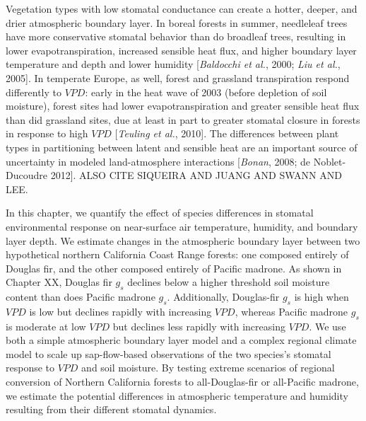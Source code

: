 Vegetation types with low stomatal conductance can create a hotter, deeper, and drier atmospheric boundary layer.  In boreal forests in summer, needleleaf trees have more conservative stomatal behavior than do broadleaf trees, resulting in lower evapotranspiration, increased sensible heat flux, and higher boundary layer temperature and depth and lower humidity [\textit{Baldocchi et al.}, 2000; \textit{Liu et al.}, 2005].  In temperate Europe, as well, forest and grassland transpiration respond differently to $VPD$: early in the heat wave of 2003 (before depletion of soil moisture), forest sites had lower evapotranspiration and greater sensible heat flux than did grassland sites, due at least in part to greater stomatal closure in forests in response to high $VPD$ [\textit{Teuling et al.}, 2010].  The differences between plant types in partitioning between latent and sensible heat are an important source of uncertainty in modeled land-atmosphere interactions [\textit{Bonan}, 2008; de Noblet-Ducoudre 2012].  ALSO CITE SIQUEIRA AND JUANG AND SWANN AND LEE.

In this chapter, we quantify the effect of species differences in stomatal environmental response on near-surface air temperature, humidity, and boundary layer depth.  We estimate changes in the atmospheric boundary layer between two hypothetical northern California Coast Range forests: one composed entirely of Douglas fir, and the other composed entirely of Pacific madrone.  As shown in Chapter XX, Douglas fir $g_s$ declines below a higher threshold soil moisture content than does Pacific madrone $g_s$.  Additionally, Douglas-fir $g_s$ is high when $VPD$ is low but declines rapidly with increasing $VPD$, whereas Pacific madrone $g_s$ is moderate at low $VPD$ but declines less rapidly with increasing $VPD$.  We use both a simple atmospheric boundary layer model and a complex regional climate model to scale up sap-flow-based observations of the two species's stomatal response to $VPD$ and soil moisture.  By testing extreme scenarios of regional conversion of Northern California forests to all-Douglas-fir or all-Pacific madrone, we estimate the potential differences in atmospheric temperature and humidity resulting from their different stomatal dynamics.
